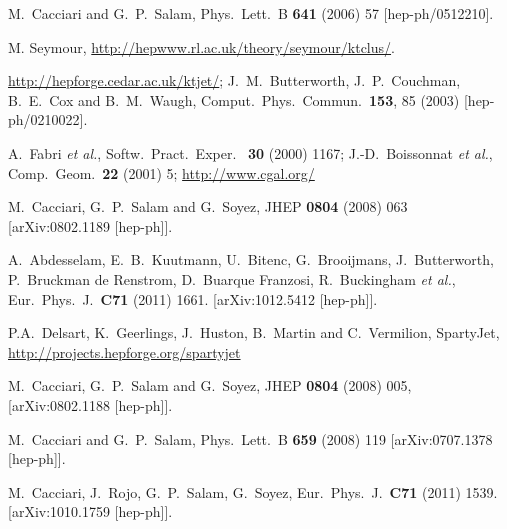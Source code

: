 \documentclass[12pt,a4]{article}
\begin{document}
\begin{thebibliography}{99}
  M.~Cacciari and G.~P.~Salam,
  Phys.\ Lett.\ B {\bf 641} (2006) 57
  [hep-ph/0512210].

  M. Seymour,
  \url{http://hepwww.rl.ac.uk/theory/seymour/ktclus/}.


  \url{http://hepforge.cedar.ac.uk/ktjet/};
  J.~M.~Butterworth, J.~P.~Couchman, B.~E.~Cox and B.~M.~Waugh,
  Comput.\ Phys.\ Commun.\  {\bf 153}, 85 (2003)
  [hep-ph/0210022].

A.~Fabri {\it et al.},
Softw.~Pract.~Exper.~ {\bf 30} (2000) 1167;
J.-D.~Boissonnat {\it et al.},
Comp.~Geom.~{\bf 22} (2001) 5; \url{http://www.cgal.org/}
  
  M.~Cacciari, G.~P.~Salam and G.~Soyez,
  JHEP {\bf 0804} (2008) 063
  [arXiv:0802.1189 [hep-ph]].

  A.~Abdesselam, E.~B.~Kuutmann, U.~Bitenc, G.~Brooijmans, J.~Butterworth, P.~Bruckman de Renstrom, D.~Buarque Franzosi, R.~Buckingham {\it et al.},
  Eur.\ Phys.\ J.\  {\bf C71 } (2011)  1661.
  [arXiv:1012.5412 [hep-ph]].

 P.A.~Delsart, K.~Geerlings, J.~Huston,
  B.~Martin and C.~Vermilion, SpartyJet,
  \url{http://projects.hepforge.org/spartyjet}

  M.~Cacciari, G.~P.~Salam and G.~Soyez,
  JHEP {\bf 0804} (2008) 005,
  [arXiv:0802.1188 [hep-ph]].

  M.~Cacciari and G.~P.~Salam,
  Phys.\ Lett.\  B {\bf 659} (2008) 119
  [arXiv:0707.1378 [hep-ph]].

  M.~Cacciari, J.~Rojo, G.~P.~Salam, G.~Soyez,
  Eur.\ Phys.\ J.\  {\bf C71 } (2011)  1539.
  [arXiv:1010.1759 [hep-ph]].


\end{thebibliography}
\end{document}
